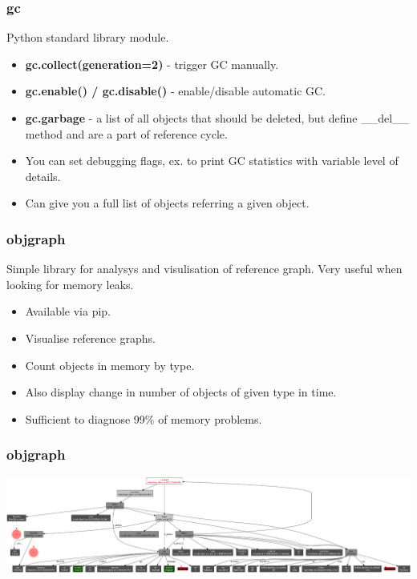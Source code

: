 \documentclass{beamer}
\begin{document}
    \begin{frame}
        \frametitle{gc}
        Python standard library module.
        \begin{itemize}
            \item \textbf{gc.collect(generation=2)} - trigger GC manually.
            \item \textbf{gc.enable() / gc.disable()} - enable/disable automatic GC.
            \item \textbf{gc.garbage} - a list of all objects that should be deleted, but define \_\_del\_\_ method and are a part of reference cycle.
            \item You can set debugging flags, ex. to print GC statistics with variable level of details.
            \item Can give you a full list of objects referring a given object.
        \end{itemize}
    \end{frame}

    \begin{frame}
        \frametitle{objgraph}
        Simple library for analysys and visulisation of reference graph. Very useful when looking for memory leaks.
        \begin{itemize}
            \item Available via pip.
            \item Visualise reference graphs.
            \item Count objects in memory by type.
            \item Also display change in number of objects of given type in time.
            \item Sufficient to diagnose 99\% of memory problems.
        \end{itemize}
    \end{frame}

    \begin{frame}
        \frametitle{objgraph}
        \includegraphics[height=0.3\textheight]{objgraph_example.png}
    \end{frame}
\end{document}

